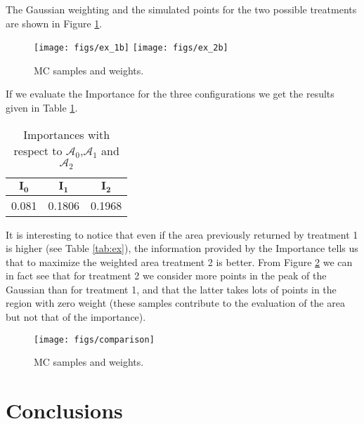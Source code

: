 The Gaussian weighting and the simulated points for the two possible treatments are shown in Figure \ref{fig:ex1b}.

\begin{figure}[!ht]
  \centering
  \texttt{[image: figs/ex\_1b]}
  \hfill
  \texttt{[image: figs/ex\_2b]}
\caption{MC samples and weights.}
\label{fig:ex1b}
\end{figure}

If we evaluate the Importance for the three configurations we get the results given in Table \ref{tab:exI}.

\begin{table}[!h]
\begin{center}
\begin{tabular}{|c|c|c|}
\hline
\bf $\mathbf{I_0}$ & \bf $\mathbf{I_1}$ & \bf $\mathbf{I_2}$ \\  \hline

 0.081 &   0.1806 &   0.1968 \\\hline

\end{tabular}
\caption{Importances with respect to $\mathcal{A}_0$,$\mathcal{A}_1$ and $\mathcal{A}_2$}
\label{tab:exI}
\end{center}
\end{table}

It is interesting to notice that even if the area previously returned by treatment 1 is higher (see Table \ref{tab:ex}), the information provided by the Importance tells us that to maximize the weighted area treatment 2 is better.
From Figure \ref{fig:comp} we can in fact see that for treatment 2 we consider more points in the peak of the Gaussian than for treatment 1, and that the latter takes lots of points in the region with zero weight (these samples contribute to the evaluation of the area but not that of the importance).

\begin{figure}[!ht]
  \centering
  \texttt{[image: figs/comparison]}
  \caption{MC samples and weights.}
\label{fig:comp}
\end{figure}



\section{Conclusions}

